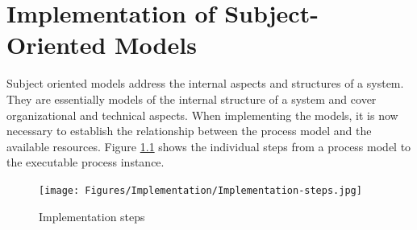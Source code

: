 
%





\chapter{Implementation of Subject-Oriented Models}



Subject oriented models address the internal aspects and structures of a system. They are essentially models of the internal structure of a system and cover organizational and technical aspects. When implementing the models, it is now necessary to establish the relationship between the process model and the available resources. Figure \ref{fig:Implementation-steps} shows the individual steps from a process model to the executable process instance.

\begin{figure}[h]
	\centering
	\texttt{[image: Figures/Implementation/Implementation-steps.jpg]}
	\caption[Implementation steps]{Implementation steps}
	\label{fig:Implementation-steps}
\end{figure}

